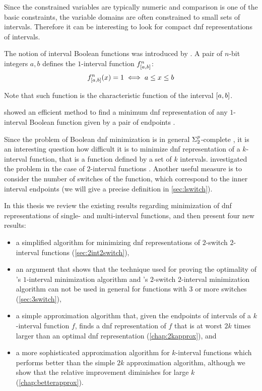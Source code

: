 Since the constrained variables are typically numeric
and comparison is one of the basic constraints,
the variable domains are often constrained
to small sets of intervals.
Therefore it can be interesting to look
for compact \acrshort{dnf}
representations of intervals.

The notion of
interval Boolean functions was introduced
by \citet{Schieber2005154}.
A pair of $n$-bit integers $a, b$
defines the $1$-interval function
$f^{n}_{[a, b]}$:
$$
f^{n}_{[a, b]} (x) = 1
\iff a \leq x \leq b
$$

Note that such function
is the characteristic function of the interval
$[a, b]$.

\citeauthor{Schieber2005154} showed an efficient method
to find a minimum \acrfull{dnf} representation
of any $1$-interval Boolean function
given by a pair of endpoints \citep{Schieber2005154}.

Since the problem of Boolean \acrshort{dnf} minimization is in general
$\Sigma_2^p$-complete \citep{Umans1998},
it is an interesting question how difficult it is
to minimize \acrshort{dnf} representation of
a $k$-interval function,
that is a function defined by a set of $k$ intervals.
\citeauthor{Dubovsky2012} investigated the problem
in the case of $2$-interval functions
\citep{Dubovsky2012}.
Another useful measure
is to consider the number of switches of the function,
which correspond to the inner interval endpoints
(we will give a precise definition
in \cref{sec:lswitch}).

In this thesis we review the existing results regarding
minimization of \acrshort{dnf} representations of
single- and multi-interval functions,
and then present four new results:

\begin{itemize}
\item a simplified algorithm
for minimizing \acrshort{dnf} representations
of $2$-switch
$2$-interval functions (\cref{sec:2int2switch}),

\item
an argument that shows
that the technique used for proving the optimality
of \citeauthor{Schieber2005154}'s
$1$-interval minimization algorithm
\citep{Schieber2005154}
and \citeauthor{Dubovsky2012}'s
$2$-switch $2$-interval minimization algorithm
\citep{Dubovsky2012}
can not be used in general for
functions with $3$ or more switches
(\cref{sec:3switch}),

\item
a simple approximation algorithm that,
given the endpoints of intervals
of a $k$-interval function $f$,
finds a \acrshort{dnf} representation of $f$
that is at worst
$2k$ times larger
than an optimal \acrshort{dnf} representation
(\cref{chap:2kapprox}), and

\item
a more sophisticated approximation algorithm
for $k$-interval functions
which performs better than the simple $2k$ approximation algorithm,
although we show that the relative improvement
diminishes for large $k$
(\cref{chap:betterapprox}).
\end{itemize}
